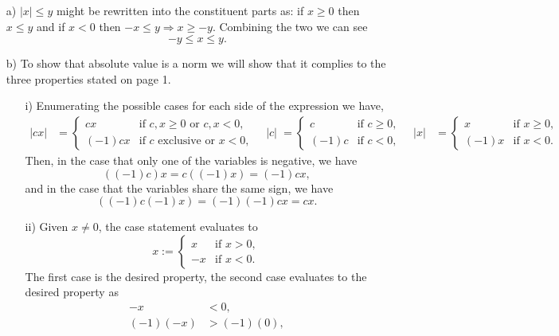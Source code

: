 \documentclass[12 pt,letterpaper]{article}
\begin{document}
\begin{enumerate}
    \item[a)]
    \(|x| \leq y\)
    might be rewritten into the constituent parts as:
    if \(x \geq 0\) then \(x \leq y\)
    and if \(x < 0\) then \(-x \leq y \Rightarrow x \geq -y\).
    Combining the two we can see
    \[-y\leq x\leq y.\]

    \item[b)]
    To show that absolute value is a norm we will show that it complies to
    the three properties stated on page 1.
    \begin{enumerate}
        \item[i)]
        Enumerating the possible cases for each side of the expression we have,
        \begin{align*}
            |cx| &=
            \begin{cases}
                cx & \text{if } c,x\geq0 \text{ or } c,x<0,\\
                (-1)cx & \text{if } c \text{ exclusive or } x <0,
            \end{cases} \quad
            |c| &=
            \begin{cases}
                c & \text{if } c\geq0,\\
                (-1)c & \text{if } c <0,
            \end{cases} \quad
            |x| &=
            \begin{cases}
                x & \text{if } x\geq0,\\
                (-1)x & \text{if } x <0.
            \end{cases}
        \end{align*}
        Then, in the case that only one of the variables is negative, we have
        \[((-1)c)x = c((-1)x) = (-1)cx,\]
        and in the case that the variables share the same sign, we have
        \[((-1)c(-1)x) = (-1)(-1)cx = cx.\]
        \item[ii)]
        Given \(x\neq0\), the case statement evaluates to
        \[x:=\begin{cases} 
            x & \text{if } x > 0,\\
            -x & \text{if } x < 0.
        \end{cases}\]
        The first case is the desired property,
        the second case evaluates to the desired property as
        \begin{align*}
            -x &< 0,\\
            (-1)(-x) &> (-1)(0),\\

\end{align*}
\end{enumerate}
\end{enumerate}
\end{document}
